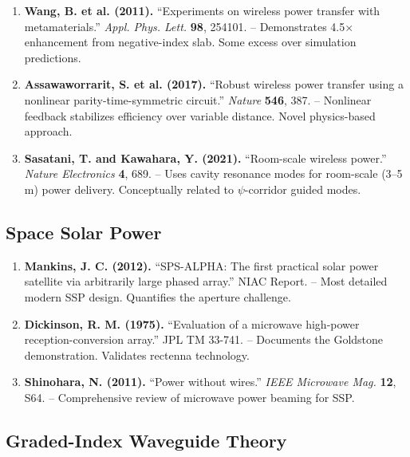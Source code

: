 \documentclass[11pt,a4paper]{article}
\begin{document}
\begin{enumerate}[resume]
\item \textbf{Wang, B. et al. (2011).} ``Experiments on wireless power
transfer with metamaterials.'' \textit{Appl. Phys. Lett.} \textbf{98}, 254101.
-- Demonstrates 4.5$\times$ enhancement from negative-index slab.
Some excess over simulation predictions.

\item \textbf{Assawaworrarit, S. et al. (2017).} ``Robust wireless power
transfer using a nonlinear parity-time-symmetric circuit.''
\textit{Nature} \textbf{546}, 387.
-- Nonlinear feedback stabilizes efficiency over variable distance.
Novel physics-based approach.

\item \textbf{Sasatani, T. and Kawahara, Y. (2021).} ``Room-scale
wireless power.'' \textit{Nature Electronics} \textbf{4}, 689.
-- Uses cavity resonance modes for room-scale (3--5\,m) power delivery.
Conceptually related to $\psi$-corridor guided modes.
\end{enumerate}

\subsection{Space Solar Power}

\begin{enumerate}[resume]
\item \textbf{Mankins, J. C. (2012).} ``SPS-ALPHA: The first practical
solar power satellite via arbitrarily large phased array.'' NIAC Report.
-- Most detailed modern SSP design. Quantifies the aperture challenge.

\item \textbf{Dickinson, R. M. (1975).} ``Evaluation of a microwave
high-power reception-conversion array.'' JPL TM 33-741.
-- Documents the Goldstone demonstration. Validates rectenna technology.

\item \textbf{Shinohara, N. (2011).} ``Power without wires.''
\textit{IEEE Microwave Mag.} \textbf{12}, S64.
-- Comprehensive review of microwave power beaming for SSP.
\end{enumerate}

\subsection{Graded-Index Waveguide Theory}
\end{document}
